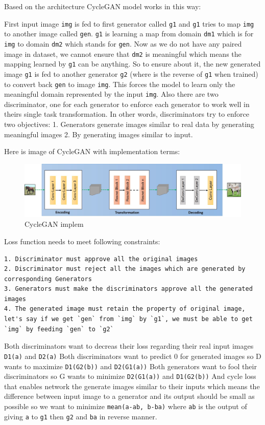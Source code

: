 \documentclass[11pt]{article}
\makeatletter
\def\maxwidth{\ifdim\Gin@nat@width>\linewidth\linewidth
    \else\Gin@nat@width\fi}
\let\Oldincludegraphics\includegraphics
\renewcommand{\includegraphics}[1]{\Oldincludegraphics[width=.8\maxwidth]{#1}}
\makeatother
\begin{document}
Based on the architecture CycleGAN model works in this way:

First input image \texttt{img} is fed to first generator called
\texttt{g1} and \texttt{g1} tries to map \texttt{img} to another image
called \texttt{gen}. \texttt{g1} is learning a map from domain
\texttt{dm1} which is for \texttt{img} to domain \texttt{dm2} which
stands for \texttt{gen}. Now as we do not have any paired image in
dataset, we cannot ensure that \texttt{dm2} is meaningful which means
the mapping learned by \texttt{g1} can be anything. So to ensure about
it, the new generated image \texttt{g1} is fed to another generator
\texttt{g2} (where is the reverse of \texttt{g1} when trained) to
convert back \texttt{gen} to image \texttt{img}. This forces the model
to learn only the meaningful domain represented by the input
\texttt{img}. Also there are two discriminator, one for each generator
to enforce each generator to work well in theirs single task
transformation. In other words, discriminators try to enforce two
objectives: 1. Generators generate images similar to real data by
generating meaningful images 2. By generating images similar to input.

Here is image of CycleGAN with implementation terms:

\begin{figure}
\centering
\includegraphics{wiki/3_6.jpg}
\caption{CycleGAN implem}
\end{figure}

Loss function needs to meet following constraints:

\begin{verbatim}
1. Discriminator must approve all the original images
2. Discriminator must reject all the images which are generated by corresponding Generators
3. Generators must make the discriminators approve all the generated images
4. The generated image must retain the property of original image, let's say if we get `gen` from `img` by `g1`, we must be able to get `img` by feeding `gen` to `g2`
\end{verbatim}

Both discriminators want to decreas their loss regarding their real
input images \texttt{D1(a)} and \texttt{D2(a)} Both discriminators want
to predict 0 for generated images so D wants to maximize
\texttt{D1(G2(b))} and \texttt{D2(G1(a))} Both generators want to fool
their discriminators so G wants to minimize \texttt{D2(G1(a))} and
\texttt{D1(G2(b))} And cycle loss that enables network the generate
images similar to their inputs which means the difference between input
image to a generator and its output should be small as possible so we
want to minimize \texttt{mean(a-ab,\ b-ba)} where \texttt{ab} is the
output of giving \texttt{a} to \texttt{g1} then \texttt{g2} and
\texttt{ba} in reverse manner.
\end{document}
